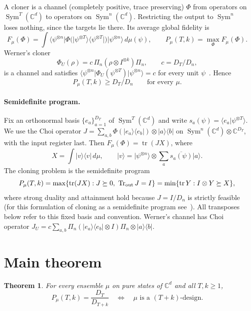 \documentclass[11pt]{article}
\newcommand{\C}{\mathbb{C}}
\newcommand{\tr}{\operatorname{tr}}
\newcommand{\Tr}{\operatorname{Tr}}
\newcommand{\Sym}{\operatorname{Sym}}
\newcommand{\ket}[1]{\lvert #1\rangle}
\newcommand{\bra}[1]{\langle #1\rvert}
\newtheorem{theorem}{Theorem}
\theoremstyle{definition}
\theoremstyle{remark}
\begin{document}
A cloner is a channel (completely positive, trace preserving) $\Phi$ from operators on $\Sym^T(\C^d)$ to operators on
$\Sym^n(\C^d)$. Restricting the output to $\Sym^n$ loses nothing, since the targets lie there. Its average global
fidelity is
\[
F_\mu(\Phi)=\int\bra{\psi^{\otimes n}}\Phi\big(\ket{\psi^{\otimes T}}\!\bra{\psi^{\otimes T}}\big)\ket{\psi^{\otimes n}}\,d\mu(\psi),
\qquad P_\mu(T,k)=\max_\Phi F_\mu(\Phi).
\]
Werner's cloner
\[
\Phi_U(\rho)=c\,\Pi_n(\rho\otimes I^{\otimes k})\Pi_n,\qquad c=D_T/D_n,
\]
is a channel and satisfies $\bra{\psi^{\otimes n}}\Phi_U(\psi^{\otimes T})\ket{\psi^{\otimes n}}=c$ for every unit
$\psi$~\cite{Werner1998}. Hence
\begin{equation}\label{eq:lower}
P_\mu(T,k)\ge D_T/D_n\qquad\text{for every }\mu.
\end{equation}

\paragraph{Semidefinite program.} Fix an orthonormal basis $\{e_a\}_{a=1}^{D_T}$ of $\Sym^T(\C^d)$ and write
$s_a(\psi)=\langle e_a|\psi^{\otimes T}\rangle$. We use the Choi operator
$J=\sum_{a,b}\Phi(\ket{e_a}\!\bra{e_b})\otimes\ket a\!\bra b$ on $\Sym^n(\C^d)\otimes\C^{D_T}$, with the input register
last. Then $F_\mu(\Phi)=\tr(JX)$, where
\[
X=\int\ket v\!\bra v\,d\mu,\qquad \ket v=\ket{\psi^{\otimes n}}\otimes\textstyle\sum_a\overline{s_a(\psi)}\ket a .
\]
The cloning problem is the semidefinite program
\begin{equation}\label{eq:sdp}
P_\mu(T,k)=\max\{\tr(JX):J\succeq0,\ \Tr_{\rm out}J=I\}=\min\{\tr Y:I\otimes Y\succeq X\},
\end{equation}
where strong duality and attainment hold because $J=I/D_n$ is strictly feasible (for this formulation of
cloning as a semidefinite program see~\cite[Secs.~2--3]{MVW2012}). All transposes below refer to this
fixed basis and convention. Werner's channel has Choi operator
$J_U=c\sum_{a,b}\Pi_n(\ket{e_a}\!\bra{e_b}\otimes I)\Pi_n\otimes\ket a\!\bra b$.

\section{Main theorem}\label{sec:main}
\begin{theorem}\label{thm:main}
For every ensemble $\mu$ on pure states of $\C^d$ and all $T,k\ge1$,
\[
P_\mu(T,k)=\frac{D_T}{D_{T+k}}\quad\Longleftrightarrow\quad \mu\text{ is a }(T+k)\text{-design}.
\]
\end{theorem}
\end{document}
